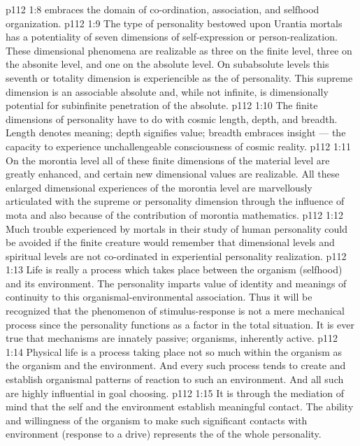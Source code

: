\vs p112 1:8 \bibnobreakspace {} embraces the domain of co\hyp{}ordination, association, and selfhood organization.
\vs p112 1:9 \pc The type of personality bestowed upon Urantia mortals has a potentiality of seven dimensions of self\hyp{}expression or person\hyp{}realization. These dimensional phenomena are realizable as three on the finite level, three on the absonite level, and one on the absolute level. On subabsolute levels this seventh or totality dimension is experiencible as the  of personality. This supreme dimension is an associable absolute and, while not infinite, is dimensionally potential for subinfinite penetration of the absolute.
\vs p112 1:10 The finite dimensions of personality have to do with cosmic length, depth, and breadth. Length denotes meaning; depth signifies value; breadth embraces insight --- the capacity to experience unchallengeable consciousness of cosmic reality.
\vs p112 1:11 On the morontia level all of these finite dimensions of the material level are greatly enhanced, and certain new dimensional values are realizable. All these enlarged dimensional experiences of the morontia level are marvellously articulated with the supreme or personality dimension through the influence of mota and also because of the contribution of morontia mathematics.
\vs p112 1:12 Much trouble experienced by mortals in their study of human personality could be avoided if the finite creature would remember that dimensional levels and spiritual levels are not co\hyp{}ordinated in experiential personality realization.
\vs p112 1:13 \pc Life is really a process which takes place between the organism (selfhood) and its environment. The personality imparts value of identity and meanings of continuity to this organismal\hyp{}environmental association. Thus it will be recognized that the phenomenon of stimulus\hyp{}response is not a mere mechanical process since the personality functions as a factor in the total situation. It is ever true that mechanisms are innately passive; organisms, inherently active.
\vs p112 1:14 Physical life is a process taking place not so much within the organism as  the organism and the environment. And every such process tends to create and establish organismal patterns of reaction to such an environment. And all such  are highly influential in goal choosing.
\vs p112 1:15 It is through the mediation of mind that the self and the environment establish meaningful contact. The ability and willingness of the organism to make such significant contacts with environment (response to a drive) represents the  of the whole personality.
